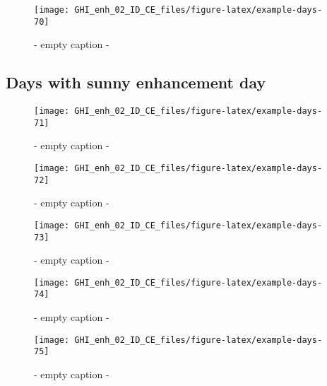 \documentclass[
  10pt,
  a4paper,oneside]{article}
\begin{document}
\begin{figure}[H]

{\centering \texttt{[image: GHI\_enh\_02\_ID\_CE\_files/figure-latex/example-days-70]} 

}

\caption{ - empty caption - }\label{fig:example-days-70}
\end{figure}

\FloatBarrier

\hypertarget{days-with-sunny-enhancement-day}{%
\subsection{Days with sunny enhancement day}\label{days-with-sunny-enhancement-day}}

\begin{figure}[H]

{\centering \texttt{[image: GHI\_enh\_02\_ID\_CE\_files/figure-latex/example-days-71]} 

}

\caption{ - empty caption - }\label{fig:example-days-71}
\end{figure}

\begin{figure}[H]

{\centering \texttt{[image: GHI\_enh\_02\_ID\_CE\_files/figure-latex/example-days-72]} 

}

\caption{ - empty caption - }\label{fig:example-days-72}
\end{figure}

\begin{figure}[H]

{\centering \texttt{[image: GHI\_enh\_02\_ID\_CE\_files/figure-latex/example-days-73]} 

}

\caption{ - empty caption - }\label{fig:example-days-73}
\end{figure}

\begin{figure}[H]

{\centering \texttt{[image: GHI\_enh\_02\_ID\_CE\_files/figure-latex/example-days-74]} 

}

\caption{ - empty caption - }\label{fig:example-days-74}
\end{figure}

\begin{figure}[H]

{\centering \texttt{[image: GHI\_enh\_02\_ID\_CE\_files/figure-latex/example-days-75]} 

}

\caption{ - empty caption - }\label{fig:example-days-75}
\end{figure}
\end{document}
